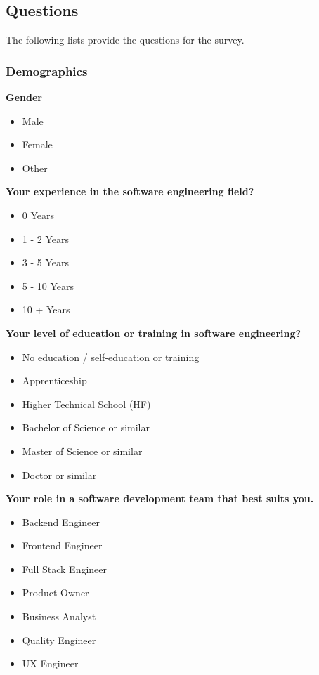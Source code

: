 \newpage

\subsection*{Questions}
The following lists provide the questions for the survey. 


\subsubsection*{Demographics}

\textbf{Gender}
\begin{itemize}
    \item Male
    \item Female
    \item Other
\end{itemize}

\textbf{Your experience in the software engineering field?}
\begin{itemize}
    \item 0 Years
    \item 1 - 2 Years
    \item 3 - 5 Years
    \item 5 - 10 Years
    \item 10 + Years
\end{itemize}

\textbf{Your level of education or training in software engineering?}
\begin{itemize}
    \item No education / self-education or training
    \item Apprenticeship
    \item Higher Technical School (HF)
    \item Bachelor of Science or similar
    \item Master of Science or similar
    \item Doctor or similar
\end{itemize}

\textbf{Your role in a software development team that best suits you.}
\begin{itemize}
    \item Backend Engineer
    \item Frontend Engineer
    \item Full Stack Engineer
    \item Product Owner
    \item Business Analyst
    \item Quality Engineer
    \item UX Engineer
\end{itemize}

